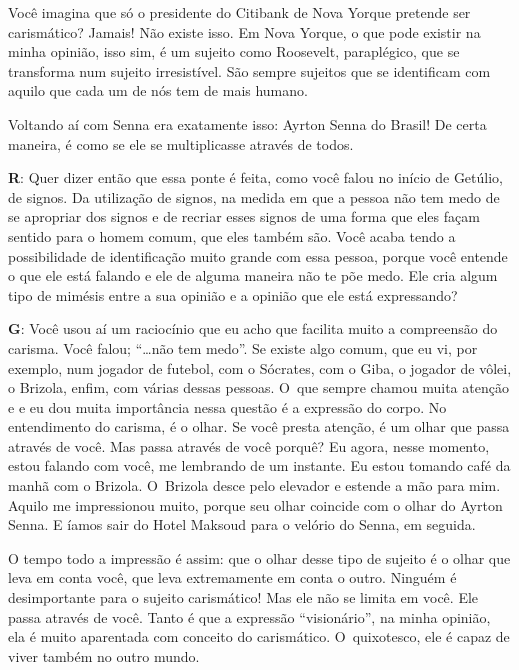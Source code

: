 Você imagina que só o presidente do Citibank de Nova Yorque pretende ser
carismático? Jamais! Não existe isso. Em Nova Yorque, o que pode existir
na minha opinião, isso sim, é um sujeito como Roosevelt, paraplégico,
que se transforma num sujeito irresistível. São sempre sujeitos que
se identificam com aquilo que cada um de nós tem de mais humano.

 

Voltando aí com Senna era exatamente isso: Ayrton Senna do Brasil! De
certa maneira, é como se ele se multiplicasse através de todos.

 

\textbf{R}: Quer dizer então que essa ponte é feita, como você falou no
início de Getúlio, de signos. Da utilização de signos, na medida em que
a pessoa não tem medo de se apropriar dos signos e de recriar esses
signos de uma forma que eles façam sentido para o homem comum, que eles
também são. Você acaba tendo a possibilidade de identificação muito
grande com essa pessoa, porque você entende o que ele está falando e ele
de alguma maneira não te põe medo. Ele cria algum tipo de mimésis entre
a sua opinião e a opinião que ele está expressando?

 

\textbf{G}: Você usou aí um raciocínio que eu acho que facilita muito a
compreensão do carisma. Você falou; ``…não tem medo''. Se existe
algo comum, que eu vi, por exemplo, num jogador de futebol, com o Sócrates,
com o Giba, o jogador de vôlei, o Brizola, enfim, com várias dessas
pessoas. O~que sempre chamou muita atenção e e eu dou muita importância
nessa questão é a expressão do corpo. No entendimento do carisma, é o
olhar. Se você presta atenção, é um olhar que passa através de você. Mas
passa através de você porquê? Eu agora, nesse momento, estou falando com
você, me lembrando de um instante. Eu estou tomando café da manhã com o
Brizola. O~Brizola desce pelo elevador e estende a mão para mim. Aquilo
me impressionou muito, porque seu olhar coincide com o olhar do Ayrton
Senna. E íamos sair do Hotel Maksoud para o velório do Senna, em seguida.

 

O tempo todo a impressão é assim: que o olhar desse tipo de sujeito é
o olhar que leva em conta você, que leva extremamente em conta o outro.
Ninguém é desimportante para o sujeito carismático! Mas ele não se limita em você.
Ele passa através de você. Tanto é que a expressão ``visionário'', na
minha opinião, ela é muito aparentada com conceito do carismático. O~quixotesco, ele é capaz de viver também no outro mundo.


